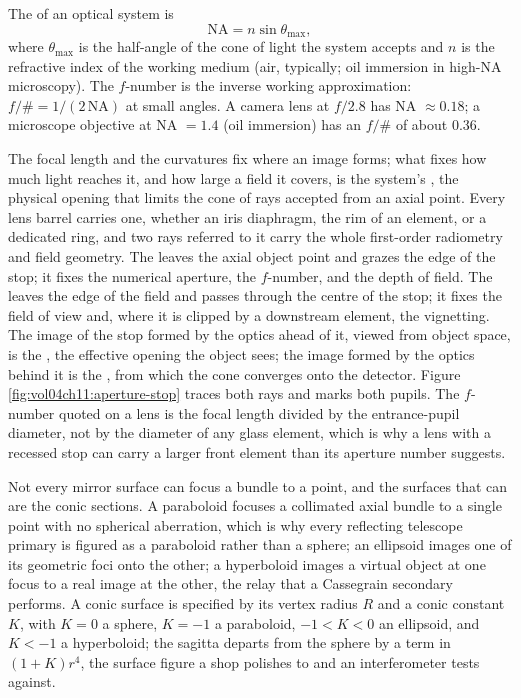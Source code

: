 

The  of an optical system is
\[
\text{NA} = n\sin\theta_{\max},
\]
where $\theta_{\max}$ is the half-angle of the cone of light the
system accepts and $n$ is the refractive index of the working medium
(air, typically; oil immersion in high-NA microscopy). The
$f$-number is the inverse working approximation: $f/\# = 1/(2\,\text{
NA})$ at small angles. A camera lens at $f/2.8$ has NA $\approx 0.18$;
a microscope objective at NA $= 1.4$ (oil immersion) has an
$f/\#$ of about $0.36$.

The focal length and the curvatures fix where an image forms; what fixes how much
light reaches it, and how large a field it covers, is the system's
, the physical opening that limits the cone of rays
accepted from an axial point. Every lens barrel carries one, whether an iris
diaphragm, the rim of an element, or a dedicated ring, and two rays referred to it
carry the whole first-order radiometry and field geometry. The  leaves the axial object point and grazes the edge of the stop; it fixes the
numerical aperture, the $f$-number, and the depth of field. The  leaves the edge of the field and passes through the centre of the stop; it
fixes the field of view and, where it is clipped by a downstream element, the
vignetting. The image of the stop formed by the optics ahead of it, viewed from
object space, is the , the effective opening the object
sees; the image formed by the optics behind it is the , from
which the cone converges onto the detector. Figure
\ref{fig:vol04ch11:aperture-stop} traces both rays and marks both pupils. The
$f$-number quoted on a lens is the focal length divided by the entrance-pupil
diameter, not by the diameter of any glass element, which is why a lens with a
recessed stop can carry a larger front element than its aperture number suggests.



Not every mirror surface can focus a bundle to a point, and the surfaces that can
are the conic sections. A paraboloid focuses a collimated axial bundle to a single
point with no spherical aberration, which is why every reflecting telescope
primary is figured as a paraboloid rather than a sphere; an ellipsoid images one
of its geometric foci onto the other; a hyperboloid images a virtual object at one
focus to a real image at the other, the relay that a Cassegrain secondary
performs. A conic surface is specified by its vertex radius $R$ and a conic
constant $K$, with $K=0$ a sphere, $K=-1$ a paraboloid, $-1<K<0$ an ellipsoid, and
$K<-1$ a hyperboloid; the sagitta departs from the sphere by a term in $(1+K)r^4$,
the surface figure a shop polishes to and an interferometer tests against.

